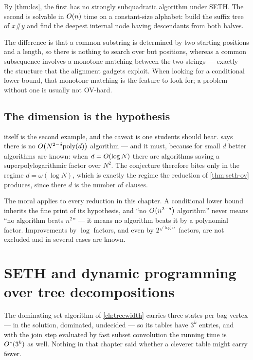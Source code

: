 By \cref{thm:lcs}, the first has no strongly subquadratic algorithm under
SETH. The second is solvable in $O\!\left(n\right)$ time on a constant-size alphabet:
build the suffix tree of $x \# y$ and find the deepest internal node having
descendants from both halves.

The difference is that a common substring is determined by two starting
positions and a length, so there is nothing to search over but positions,
whereas a common subsequence involves a monotone matching between the two
strings --- exactly the structure that the alignment gadgets exploit. When
looking for a conditional lower bound, that monotone matching is the feature to
look for; a problem without one is usually not OV-hard.

\subsection{The dimension is the hypothesis}

 itself is the second example, and the caveat is one
students should hear.  says there is no
$O\!\left(N^{2-\delta}\mathrm{poly}(d)\right)$ algorithm --- and it must, because for small $d$
better algorithms are known: when $d = O\!\left(\log N\right)$ there are algorithms
saving a superpolylogarithmic factor over $N^2$. The conjecture therefore bites
only in the regime $d = \omega(\log N)$, which is exactly the regime the
reduction of \cref{thm:seth-ov} produces, since there $d$ is the number of
clauses.

The moral applies to every reduction in this chapter. A conditional lower bound
inherits the fine print of its hypothesis, and ``no $O\!\left(n^{2-\delta}\right)$
algorithm'' never means ``no algorithm beats $n^2$'' --- it means no algorithm
beats it by a polynomial factor. Improvements by $\log$ factors, and even by
$2^{\sqrt{\log n}}$ factors, are not excluded and in several cases are known.

\section{SETH and dynamic programming over tree decompositions}
\label{sec:seth-treewidth}

The dominating set algorithm of \cref{ch:treewidth} carries three states per
bag vertex --- in the solution, dominated, undecided --- so its tables have
$3^k$ entries, and with the join step evaluated by fast subset convolution the
running time is $O^{*}{}(3^k)$ as well. Nothing in that chapter said whether a
cleverer table might carry fewer.

